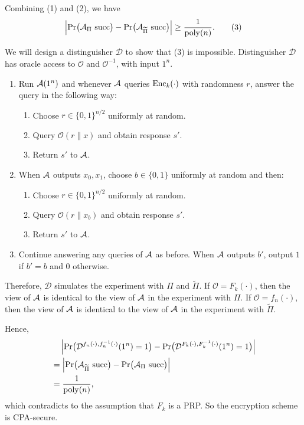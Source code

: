 \documentclass{homework}
\begin{document}
\begin{solution}
  Combining (1) and (2), we have
  \begin{equation*}
    \left\lvert \Pr \bigl(\mathcal{A}_{\Pi} \text{ succ} \bigr) -
    \Pr \bigl(\mathcal{A}_{\widetilde{\Pi}} \text{ succ} \bigr) \right\rvert
    \ge \frac{1}{\mathrm{poly}(n)}. \tag{3}
  \end{equation*}

  We will design a distinguisher $\mathcal{D}$ to show that (3) is impossible.
  Distinguisher $\mathcal{D}$ has oracle access to $\mathcal{O}$ and $\mathcal{O}^{-1}$,
  with input $1^n$.

  \begin{enumerate}
    \item Run $\mathcal{A}(1^n)$ and whenever $\mathcal{A}$ queries $\mathrm{Enc}_k(\cdot)$ with
          randomness $r$, answer the query in the following way:
          \begin{enumerate}
            \item Choose $r \in \{0, 1\}^{n/2}$ uniformly at random.
            \item Query $\mathcal{O}(r\| x)$ and obtain response $s'$.
            \item Return $s'$ to $\mathcal{A}$.
          \end{enumerate}
    \item When $\mathcal{A}$ outputs $x_0, x_1$, choose $b \in \{0, 1\}$ uniformly at random
          and then:
          \begin{enumerate}
            \item Choose $r \in \{0, 1\}^{n/2}$ uniformly at random.
            \item Query $\mathcal{O}(r \| x_b)$ and obtain response $s'$.
            \item Return $s'$ to $\mathcal{A}$.
          \end{enumerate}
    \item Continue answering any queries of $\mathcal{A}$ as before. When $\mathcal{A}$ outputs
          $b'$, output $1$ if $b' = b$ and $0$ otherwise.
  \end{enumerate}

  Therefore, $\mathcal{D}$ simulates the experiment with $\Pi$ and $\widetilde{\Pi}$.
  If $\mathcal{O} = F_{k}(\cdot)$, then the view of $\mathcal{A}$ is
  identical to the view of $\mathcal{A}$ in the experiment with $\Pi$.
  If $\mathcal{O} = f_n(\cdot)$, then the view of $\mathcal{A}$ is
  identical to the view of $\mathcal{A}$ in the experiment with $\widetilde{\Pi}$.

  Hence,
  \begin{align*}
    & \quad \left\lvert \Pr \bigl(\mathcal{D}^{f_n(\cdot), f^{-1}_n(\cdot)}(1^n) = 1 \bigr) - \Pr \bigl(\mathcal{D}^{F_k(\cdot), F^{-1}_k(\cdot)}(1^n) = 1 \bigr) \right\rvert \\
    & = \left\lvert \Pr \bigl(\mathcal{A}_{\widetilde{\Pi}} \text{ succ} \bigr) - \Pr \bigl(\mathcal{A}_{\Pi} \text{ succ} \bigr) \right\rvert\\
    & = \frac{1}{\mathrm{poly}(n)},
  \end{align*}
  which contradicts to the assumption that $F_k$ is a PRP\@.
  So the encryption scheme is CPA-secure.

\end{solution}
\end{document}

